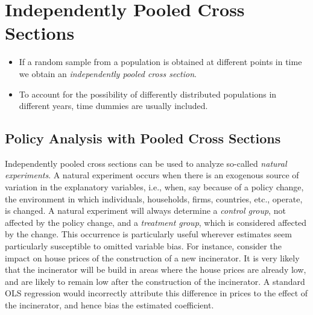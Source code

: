 \documentclass[landscape,letterpaper,9pt]{article}
\begin{document}
%
\newpage
\vspace{0.2in}
\tableofcontents
\vspace{0.2in}
\newpage
\section{Independently Pooled Cross Sections}
\begin{itemize}
    \item If a random sample from a population is obtained at different points in
    time we obtain an \emph{independently pooled cross section}.
    \item To account for the possibility of differently distributed populations in different years,
    time dummies are usually included.
\end{itemize}
\subsection{Policy Analysis with Pooled Cross Sections}
Independently pooled cross sections can  be used to analyze so-called \emph{natural experiments}.
A natural experiment occurs when there is an exogenous source of variation in the explanatory
variables, i.e., when, say because of a policy change, the environment in which individuals,
households, firms, countries,  etc., operate,  is changed.
A natural experiment will always determine a
\emph{control group}, not affected by the policy change,
and a \emph{treatment group}, which is considered affected by the change.
This occurrence is particularly useful wherever estimates seem particularly susceptible to
omitted variable bias. For instance, consider the impact on house prices of the
construction of a new incinerator.
It is very likely that the incinerator will be build in areas where the house prices are
already low, and are likely to remain low after the construction of the incinerator.
A standard OLS regression would incorrectly attribute this difference in prices to the effect of
the incinerator, and hence bias the estimated coefficient.
\end{document}
